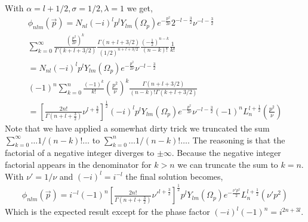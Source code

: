 \documentclass[10pt]{article}
\begin{document}
With $\alpha = l+1/2, \sigma = 1/2, \lambda = 1$ we get,
\begin{multline*}
	\phi_{n l m}(\vec{p}) = N_{nl} (-i)^{l} p^{l}  Y_{l m}(\Omega_p) e^{-\frac{p^{2}}{2 \nu}} 2^{-l-\frac{3}{2}} \nu^{-l-\frac{3}{2}} \\
	 \sum_{k=0}^{\infty}  \frac{\left( \frac{p^{2}}{2 \nu} \right)^{k}}{\Gamma(k+l+3/2)} \frac{\Gamma(n+l+3/2)}{(1/2)^{n+l+3/2}} \frac{\left(-\frac{1}{2}\right)^{n-k}}{(n-k)!} \frac{1}{k!} \\
	 = N_{nl} (-i)^{l} p^{l}  Y_{l m}(\Omega_p) e^{-\frac{p^{2}}{2 \nu}} \nu^{-l-\frac{3}{2}} \\
	 (-1)^{n} \sum_{k=0}^{n} \frac{(-1)^{k}}{k!} \left( \frac{p^{2}}{\nu} \right)^{k} \frac{\Gamma(n+l+3/2)}{(n-k)! \Gamma(k+l+3/2)} \\
	 = \left[ \frac{ 2n!}{\Gamma(n+l+\frac{3}{2})} \nu^{l+\frac{3}{2}} \right]^{\frac{1}{2}} (-i)^{l} p^{l}  Y_{l m}(\Omega_p) e^{-\frac{p^{2}}{2 \nu}} \nu^{-l-\frac{3}{2}} (-1)^{n} L_{n}^{l+\frac{1}{2}}(\frac{p^{2}}{\nu})
\end{multline*}
Note that we have applied a somewhat dirty trick we truncated the sum $\sum_{k=0}^{\infty} \ldots 1/(n-k)! \ldots$ to $ \sum_{k=0}^{n} \ldots 1/(n-k)! \ldots$. The reasoning is that the factorial of a negative integer diverges to $\pm \infty$. Because the negative integer factorial appears in the denominator for $k>n$ we can truncate the sum to $k=n$. With $\nu' = 1/\nu$ and $(-i)^{l}=i^{-l}$ the final solution becomes,
\begin{align*}
	\phi_{n l m}(\vec{p}) =  i^{-l} (-1)^{n} \left[ \frac{ 2n!}{\Gamma(n+l+\frac{3}{2})} \nu'^{l+\frac{3}{2}} \right]^{\frac{1}{2}} p^{l}  Y_{l m}(\Omega_p) e^{-\frac{\nu' p^{2}}{2}} L_{n}^{l+\frac{1}{2}}(\nu'p^{2})
\end{align*}
Which is the expected result except for the phase factor $(-i)^{l} (-1)^{n} = i^{2n+3l}$.
\end{document}
